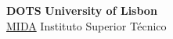 \documentclass{article}
\begin{document}
\noindent
\large\textbf{DOTS} \hfill \textbf{University of Lisbon} \\
\normalsize
\hyperlink{https://mida-project.github.io/}{MIDA} \hfill Instituto Superior T\'{e}cnico \\



\clearpage


\end{document}
